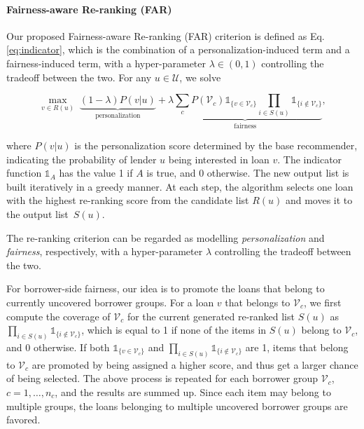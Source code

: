 \paragraph{\textbf{Fairness-aware Re-ranking (FAR)}}
Our proposed Fairness-aware Re-ranking (FAR) criterion is defined as Eq.\eqref{eq:indicator}, which is the combination of a personalization-induced term and a fairness-induced term, with a hyper-parameter $\lambda\in(0,1)$ controlling the tradeoff between the two. For any $u\in \mathcal U$, we solve

\begin{equation}
\max_{v\in R(u)}\;\underbrace{(1-\lambda)P(v|u)}_{\text{personalization}} + \underbrace{\lambda\sum_{c}P(\mathcal V_c)\mathds{1}_{\{v\in \mathcal V_c\}}\prod_{i\in S(u)}\mathds{1}_{\{i\notin \mathcal V_c\}}}_{\text{fairness}},%
\label{eq:indicator}
\end{equation}

where $P(v|u)$ is the personalization score determined by the base recommender, indicating the probability of lender $u$ being interested in loan $v$. The indicator function $\mathds{1}_{A}$ has the value 1 if $A$ is true, and 0 otherwise. The new output list is built iteratively in a greedy manner. At each step, the algorithm selects one loan with the highest re-ranking score from the candidate list $R(u)$ and moves it to the output list~$S(u)$.

The re-ranking criterion can be regarded as modelling \textit{personalization} and \textit{fairness}, respectively, with a hyper-parameter $\lambda$ controlling the tradeoff between the two.

For borrower-side fairness, our idea is to promote the loans that belong to currently uncovered borrower groups. For a loan $v$ that belongs to $\mathcal V_c$, we first compute the coverage of $\mathcal V_c$ for the current generated re-ranked list $S(u)$ as $\prod_{i\in S(u)}\mathds{1}_{\{i\notin \mathcal V_c\}}$, which is equal to 1 if none of the items in $S(u)$ belong to $\mathcal V_c$, and 0 otherwise. If both $\mathds{1}_{\{v\in \mathcal V_c\}}$ and $\prod_{i\in S(u)}\mathds{1}_{\{i\notin \mathcal V_c\}}$ are 1, items that belong to $\mathcal V_c$ are promoted by being assigned a higher score, and thus get a larger chance of being selected. The above process is repeated for each borrower group $\mathcal V_c$, $c={1,\ldots,n_c}$, and the results are summed up. Since each item may belong to multiple groups, the loans belonging to multiple uncovered borrower groups are favored. 


